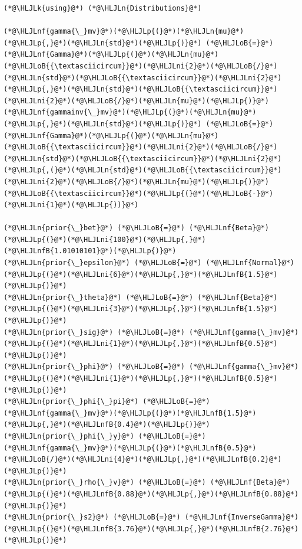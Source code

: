 \documentclass[12pt,a4paper]{article}
\newcommand{\HLJLk}[1]{\textcolor[RGB]{148,91,176}{\textbf{#1}}}
\newcommand{\HLJLn}[1]{#1}
\newcommand{\HLJLnf}[1]{\textcolor[RGB]{66,102,213}{#1}}
\newcommand{\HLJLnfB}[1]{\textcolor[RGB]{59,151,46}{#1}}
\newcommand{\HLJLni}[1]{\textcolor[RGB]{59,151,46}{#1}}
\newcommand{\HLJLoB}[1]{\textcolor[RGB]{102,102,102}{\textbf{#1}}}
\newcommand{\HLJLp}[1]{#1}
\begin{document}
\begin{lstlisting}
(*@\HLJLk{using}@*) (*@\HLJLn{Distributions}@*)

(*@\HLJLnf{gamma{\_}mv}@*)(*@\HLJLp{(}@*)(*@\HLJLn{mu}@*)(*@\HLJLp{,}@*)(*@\HLJLn{std}@*)(*@\HLJLp{)}@*) (*@\HLJLoB{=}@*) (*@\HLJLnf{Gamma}@*)(*@\HLJLp{(}@*)(*@\HLJLn{mu}@*)(*@\HLJLoB{{\textasciicircum}}@*)(*@\HLJLni{2}@*)(*@\HLJLoB{/}@*)(*@\HLJLn{std}@*)(*@\HLJLoB{{\textasciicircum}}@*)(*@\HLJLni{2}@*)(*@\HLJLp{,}@*)(*@\HLJLn{std}@*)(*@\HLJLoB{{\textasciicircum}}@*)(*@\HLJLni{2}@*)(*@\HLJLoB{/}@*)(*@\HLJLn{mu}@*)(*@\HLJLp{)}@*)
(*@\HLJLnf{gammainv{\_}mv}@*)(*@\HLJLp{(}@*)(*@\HLJLn{mu}@*)(*@\HLJLp{,}@*)(*@\HLJLn{std}@*)(*@\HLJLp{)}@*) (*@\HLJLoB{=}@*) (*@\HLJLnf{Gamma}@*)(*@\HLJLp{(}@*)(*@\HLJLn{mu}@*)(*@\HLJLoB{{\textasciicircum}}@*)(*@\HLJLni{2}@*)(*@\HLJLoB{/}@*)(*@\HLJLn{std}@*)(*@\HLJLoB{{\textasciicircum}}@*)(*@\HLJLni{2}@*)(*@\HLJLp{,(}@*)(*@\HLJLn{std}@*)(*@\HLJLoB{{\textasciicircum}}@*)(*@\HLJLni{2}@*)(*@\HLJLoB{/}@*)(*@\HLJLn{mu}@*)(*@\HLJLp{)}@*)(*@\HLJLoB{{\textasciicircum}}@*)(*@\HLJLp{(}@*)(*@\HLJLoB{-}@*)(*@\HLJLni{1}@*)(*@\HLJLp{))}@*)

(*@\HLJLn{prior{\_}bet}@*) (*@\HLJLoB{=}@*) (*@\HLJLnf{Beta}@*)(*@\HLJLp{(}@*)(*@\HLJLni{100}@*)(*@\HLJLp{,}@*)(*@\HLJLnfB{1.01010101}@*)(*@\HLJLp{)}@*)
(*@\HLJLn{prior{\_}epsilon}@*) (*@\HLJLoB{=}@*) (*@\HLJLnf{Normal}@*)(*@\HLJLp{(}@*)(*@\HLJLni{6}@*)(*@\HLJLp{,}@*)(*@\HLJLnfB{1.5}@*)(*@\HLJLp{)}@*)
(*@\HLJLn{prior{\_}theta}@*) (*@\HLJLoB{=}@*) (*@\HLJLnf{Beta}@*)(*@\HLJLp{(}@*)(*@\HLJLni{3}@*)(*@\HLJLp{,}@*)(*@\HLJLnfB{1.5}@*)(*@\HLJLp{)}@*)
(*@\HLJLn{prior{\_}sig}@*) (*@\HLJLoB{=}@*) (*@\HLJLnf{gamma{\_}mv}@*)(*@\HLJLp{(}@*)(*@\HLJLni{1}@*)(*@\HLJLp{,}@*)(*@\HLJLnfB{0.5}@*)(*@\HLJLp{)}@*)
(*@\HLJLn{prior{\_}phi}@*) (*@\HLJLoB{=}@*) (*@\HLJLnf{gamma{\_}mv}@*)(*@\HLJLp{(}@*)(*@\HLJLni{1}@*)(*@\HLJLp{,}@*)(*@\HLJLnfB{0.5}@*)(*@\HLJLp{)}@*)
(*@\HLJLn{prior{\_}phi{\_}pi}@*) (*@\HLJLoB{=}@*) (*@\HLJLnf{gamma{\_}mv}@*)(*@\HLJLp{(}@*)(*@\HLJLnfB{1.5}@*)(*@\HLJLp{,}@*)(*@\HLJLnfB{0.4}@*)(*@\HLJLp{)}@*)
(*@\HLJLn{prior{\_}phi{\_}y}@*) (*@\HLJLoB{=}@*) (*@\HLJLnf{gamma{\_}mv}@*)(*@\HLJLp{(}@*)(*@\HLJLnfB{0.5}@*)(*@\HLJLoB{/}@*)(*@\HLJLni{4}@*)(*@\HLJLp{,}@*)(*@\HLJLnfB{0.2}@*)(*@\HLJLp{)}@*)
(*@\HLJLn{prior{\_}rho{\_}v}@*) (*@\HLJLoB{=}@*) (*@\HLJLnf{Beta}@*)(*@\HLJLp{(}@*)(*@\HLJLnfB{0.88}@*)(*@\HLJLp{,}@*)(*@\HLJLnfB{0.88}@*)(*@\HLJLp{)}@*)
(*@\HLJLn{prior{\_}s2}@*) (*@\HLJLoB{=}@*) (*@\HLJLnf{InverseGamma}@*)(*@\HLJLp{(}@*)(*@\HLJLnfB{3.76}@*)(*@\HLJLp{,}@*)(*@\HLJLnfB{2.76}@*)(*@\HLJLp{)}@*)
\end{lstlisting}
\end{document}
